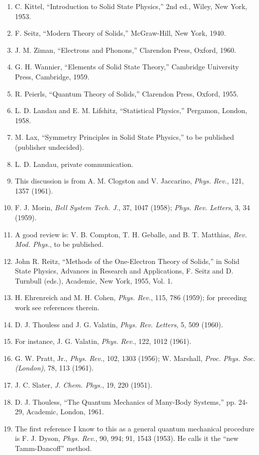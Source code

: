 \begin{enumerate}[label=(\arabic*),leftmargin=2.8em,itemsep=1pt,parsep=0pt]
\item C. Kittel, ``Introduction to Solid State Physics,'' 2nd ed., Wiley, New York, 1953.
\item F. Seitz, ``Modern Theory of Solids,'' McGraw-Hill, New York, 1940.
\item J. M. Ziman, ``Electrons and Phonons,'' Clarendon Press, Oxford, 1960.
\item G. H. Wannier, ``Elements of Solid State Theory,'' Cambridge University Press, Cambridge, 1959.
\item R. Peierls, ``Quantum Theory of Solids,'' Clarendon Press, Oxford, 1955.
\item L. D. Landau and E. M. Lifshitz, ``Statistical Physics,'' Pergamon, London, 1958.
\item[(6a)] M. Lax, ``Symmetry Principles in Solid State Physics,'' to be published (publisher undecided).
\item L. D. Landau, private communication.
\item This discussion is from A. M. Clogston and V. Jaccarino, \emph{Phys. Rev.}, 121, 1357 (1961).
\item F. J. Morin, \emph{Bell System Tech. J.}, 37, 1047 (1958); \emph{Phys. Rev. Letters}, 3, 34 (1959).
\item A good review is: V. B. Compton, T. H. Geballe, and B. T. Matthias, \emph{Rev. Mod. Phys.}, to be published.
\item John R. Reitz, ``Methods of the One-Electron Theory of Solids,'' in Solid State Physics, Advances in Research and Applications, F. Seitz and D. Turnbull (eds.), Academic, New York, 1955, Vol. 1.
\item H. Ehrenreich and M. H. Cohen, \emph{Phys. Rev.}, 115, 786 (1959); for preceding work see references therein.
\item D. J. Thouless and J. G. Valatin, \emph{Phys. Rev. Letters}, 5, 509 (1960).
\item For instance, J. G. Valatin, \emph{Phys. Rev.}, 122, 1012 (1961).
\item G. W. Pratt, Jr., \emph{Phys. Rev.}, 102, 1303 (1956); W. Marshall, \emph{Proc. Phys. Soc. (London)}, 78, 113 (1961).
\item J. C. Slater, \emph{J. Chem. Phys.}, 19, 220 (1951).
\item D. J. Thouless, ``The Quantum Mechanics of Many-Body Systems,'' pp. 24-29, Academic, London, 1961.
\item The first reference I know to this as a general quantum mechanical procedure is F. J. Dyson, \emph{Phys. Rev.}, 90, 994; 91, 1543 (1953). He calls it the ``new Tamm-Dancoff'' method.

\end{enumerate}
